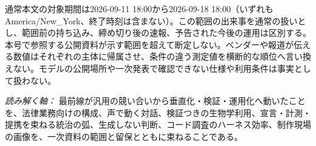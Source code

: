 \vspace{2mm}
\begin{claimboundary}[この号の読み方]
通常本文の対象期間は2026-09-11 18:00から2026-09-18 18:00（いずれもAmerica/New\_York、終了時刻は含まない）。この範囲の出来事を通常の扱いとし、範囲前の持ち込み、締め切り後の速報、予告された今後の運用は区別する。本号で参照する公開資料が示す範囲を超えて断定しない。ベンダーや報道が伝える数値はそれぞれの主体に帰属させ、条件の違う測定値を横断的な順位へ言い換えない。モデルの公開場所や一次発表で確認できない仕様や利用条件は事実として扱わない。
\end{claimboundary}

\vspace{2mm}
\noindent\textit{読み解く軸：} 最前線が汎用の競い合いから垂直化・検証・運用化へ動いたことを、法律業務向けの構成、声で動く対話、検証つきの生物学利用、宣言・計測・提携を束ねる統治の弧、生成しない判断、コード調査のハーネス効率、制作現場の画像を、一次資料の範囲と留保とともに束ねることである。
